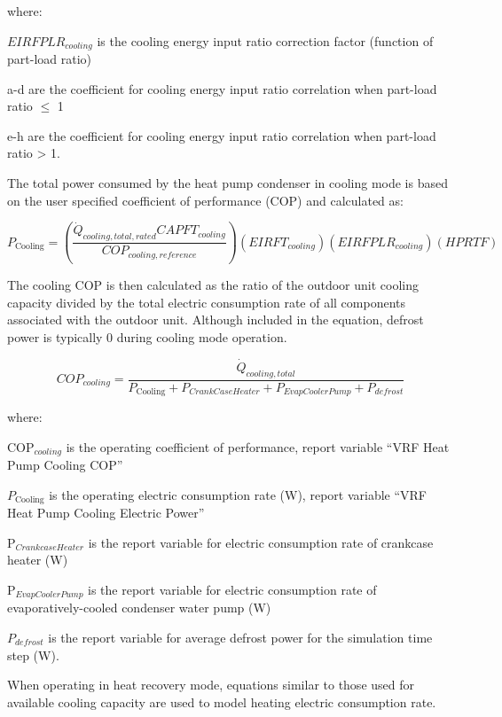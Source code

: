 where:

\(EIRFPLR_{cooling}\) is the cooling energy input ratio correction factor (function of part-load ratio)

a-d are the coefficient for cooling energy input ratio correlation when part-load ratio \(\leq\) 1

e-h are the coefficient for cooling energy input ratio correlation when part-load ratio > 1.

The total power consumed by the heat pump condenser in cooling mode is based on the user specified coefficient of performance (COP) and calculated as:

\begin{equation}
  P_{\mathrm{Cooling}} = \left( \frac{\dot{Q}_{cooling,total,rated} CAPFT_{cooling}}{COP_{cooling,reference}} \right) \left( EIRFT_{cooling} \right) \left( EIRFPLR_{cooling} \right) \left( HPRTF \right)
\end{equation}

The cooling COP is then calculated as the ratio of the outdoor unit cooling capacity divided by the total electric consumption rate of all components associated with the outdoor unit. Although included in the equation, defrost power is typically 0 during cooling mode operation.

\begin{equation}
  COP_{cooling} = \frac{\dot{Q}_{cooling,total}}{P_{\mathrm{Cooling}} + P_{CrankCaseHeater} + P_{EvapCoolerPump} + P_{defrost}}
\end{equation}

where:

COP\(_{cooling}\) is the operating coefficient of performance, report variable ``VRF Heat Pump Cooling COP''

$P_{\mathrm{Cooling}}$ is the operating electric consumption rate (W), report variable ``VRF Heat Pump Cooling Electric Power''

P\(_{CrankcaseHeater}\) is the report variable for electric consumption rate of crankcase heater (W)

P\(_{EvapCoolerPump}\) is the report variable for electric consumption rate of evaporatively-cooled condenser water pump (W)

\({P_{defrost}}\) is the report variable for average defrost power for the simulation time step (W).

When operating in heat recovery mode, equations similar to those used for available cooling capacity are used to model heating electric consumption rate.

